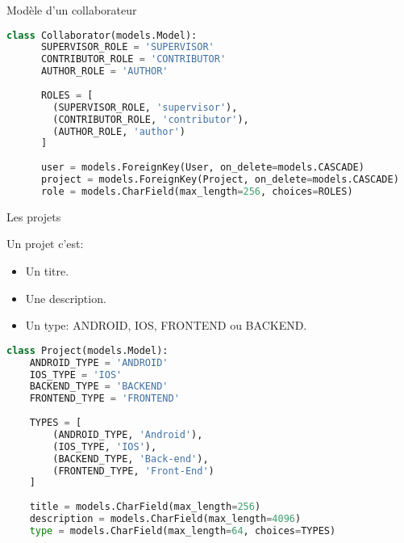 \begin{frame}[fragile]{Modèle d'un collaborateur}
  \begin{center}
    \tiny
    \begin{lstlisting}[language=python]
    class Collaborator(models.Model):
      SUPERVISOR_ROLE = 'SUPERVISOR'
      CONTRIBUTOR_ROLE = 'CONTRIBUTOR'
      AUTHOR_ROLE = 'AUTHOR'
      
      ROLES = [
        (SUPERVISOR_ROLE, 'supervisor'),
        (CONTRIBUTOR_ROLE, 'contributor'),
        (AUTHOR_ROLE, 'author')
      ]
      
      user = models.ForeignKey(User, on_delete=models.CASCADE)
      project = models.ForeignKey(Project, on_delete=models.CASCADE)
      role = models.CharField(max_length=256, choices=ROLES)
    \end{lstlisting}
  \end{center}
\end{frame}

\begin{frame}[fragile]{Les projets}
  \begin{block}{Un projet c'est:}
    \begin{itemize}
    \item Un titre.
    \item Une description.
    \item Un type: ANDROID, IOS, FRONTEND ou BACKEND.
    \end{itemize}
  \end{block}

  \begin{center}
    \tiny
    \begin{lstlisting}[language=python]
  class Project(models.Model):
    ANDROID_TYPE = 'ANDROID'
    IOS_TYPE = 'IOS'
    BACKEND_TYPE = 'BACKEND'
    FRONTEND_TYPE = 'FRONTEND'
    
    TYPES = [
        (ANDROID_TYPE, 'Android'),
        (IOS_TYPE, 'IOS'),
        (BACKEND_TYPE, 'Back-end'),
        (FRONTEND_TYPE, 'Front-End')
    ]
    
    title = models.CharField(max_length=256)
    description = models.CharField(max_length=4096)
    type = models.CharField(max_length=64, choices=TYPES)
    \end{lstlisting}
  \end{center}
\end{frame}

